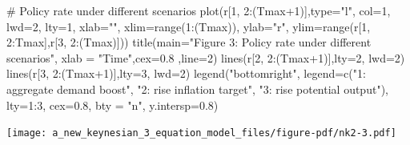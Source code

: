 \documentclass[
  letterpaper,
  DIV=11,
  numbers=noendperiod]{scrreprt}
\newenvironment{Shaded}{\begin{snugshade}}{\end{snugshade}}
\newcommand{\AttributeTok}[1]{\textcolor[rgb]{0.40,0.45,0.13}{#1}}
\newcommand{\CommentTok}[1]{\textcolor[rgb]{0.37,0.37,0.37}{#1}}
\newcommand{\DecValTok}[1]{\textcolor[rgb]{0.68,0.00,0.00}{#1}}
\newcommand{\FloatTok}[1]{\textcolor[rgb]{0.68,0.00,0.00}{#1}}
\newcommand{\FunctionTok}[1]{\textcolor[rgb]{0.28,0.35,0.67}{#1}}
\newcommand{\NormalTok}[1]{\textcolor[rgb]{0.00,0.23,0.31}{#1}}
\newcommand{\SpecialCharTok}[1]{\textcolor[rgb]{0.37,0.37,0.37}{#1}}
\newcommand{\StringTok}[1]{\textcolor[rgb]{0.13,0.47,0.30}{#1}}
\begin{document}
\begin{Shaded}
\begin{Highlighting}[]
\CommentTok{\# Policy rate under different scenarios}
\FunctionTok{plot}\NormalTok{(r[}\DecValTok{1}\NormalTok{, }\DecValTok{2}\SpecialCharTok{:}\NormalTok{(Tmax}\SpecialCharTok{+}\DecValTok{1}\NormalTok{)],}\AttributeTok{type=}\StringTok{"l"}\NormalTok{, }\AttributeTok{col=}\DecValTok{1}\NormalTok{, }\AttributeTok{lwd=}\DecValTok{2}\NormalTok{, }\AttributeTok{lty=}\DecValTok{1}\NormalTok{, }\AttributeTok{xlab=}\StringTok{""}\NormalTok{, }\AttributeTok{xlim=}\FunctionTok{range}\NormalTok{(}\DecValTok{1}\SpecialCharTok{:}\NormalTok{(Tmax)), }\AttributeTok{ylab=}\StringTok{"r"}\NormalTok{, }\AttributeTok{ylim=}\FunctionTok{range}\NormalTok{(r[}\DecValTok{1}\NormalTok{, }\DecValTok{2}\SpecialCharTok{:}\NormalTok{Tmax],r[}\DecValTok{3}\NormalTok{, }\DecValTok{2}\SpecialCharTok{:}\NormalTok{(Tmax)])) }
\FunctionTok{title}\NormalTok{(}\AttributeTok{main=}\StringTok{"Figure 3: Policy rate under different scenarios"}\NormalTok{, }\AttributeTok{xlab =} \StringTok{"Time"}\NormalTok{,}\AttributeTok{cex=}\FloatTok{0.8}\NormalTok{ ,}\AttributeTok{line=}\DecValTok{2}\NormalTok{)}
\FunctionTok{lines}\NormalTok{(r[}\DecValTok{2}\NormalTok{, }\DecValTok{2}\SpecialCharTok{:}\NormalTok{(Tmax}\SpecialCharTok{+}\DecValTok{1}\NormalTok{)],}\AttributeTok{lty=}\DecValTok{2}\NormalTok{, }\AttributeTok{lwd=}\DecValTok{2}\NormalTok{)}
\FunctionTok{lines}\NormalTok{(r[}\DecValTok{3}\NormalTok{, }\DecValTok{2}\SpecialCharTok{:}\NormalTok{(Tmax}\SpecialCharTok{+}\DecValTok{1}\NormalTok{)],}\AttributeTok{lty=}\DecValTok{3}\NormalTok{, }\AttributeTok{lwd=}\DecValTok{2}\NormalTok{)}
\FunctionTok{legend}\NormalTok{(}\StringTok{"bottomright"}\NormalTok{, }\AttributeTok{legend=}\FunctionTok{c}\NormalTok{(}\StringTok{"1: aggregate demand boost"}\NormalTok{, }\StringTok{"2: rise inflation target"}\NormalTok{, }\StringTok{"3: rise potential output"}\NormalTok{), }\AttributeTok{lty=}\DecValTok{1}\SpecialCharTok{:}\DecValTok{3}\NormalTok{, }\AttributeTok{cex=}\FloatTok{0.8}\NormalTok{, }\AttributeTok{bty =} \StringTok{"n"}\NormalTok{, }\AttributeTok{y.intersp=}\FloatTok{0.8}\NormalTok{)}
\end{Highlighting}
\end{Shaded}

\texttt{[image: a\_new\_keynesian\_3\_equation\_model\_files/figure-pdf/nk2-3.pdf]}
\end{document}
